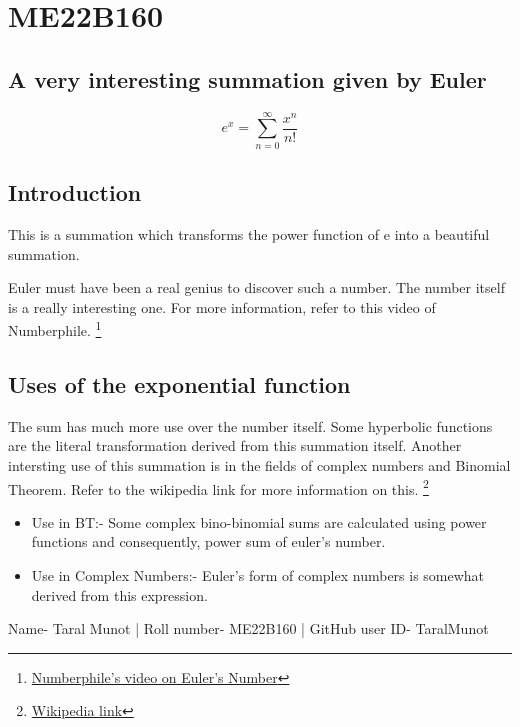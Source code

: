 \section{ME22B160}
\subsection{A very interesting summation given by Euler}
\begin{equation}
    e^x = \sum_{n=0}^{\infty} \frac{x^n}{n!}
\end{equation}
\subsection{Introduction}
This is a summation which transforms the power function of e into a beautiful summation.

Euler must have been a real genius to discover such a number. The number itself is a really interesting one. For more information, refer to this video of Numberphile. \footnote{\href{https://www.youtube.com/watch?v=AuA2EAgAegE}{Numberphile's video on Euler's Number}}
\subsection{Uses of the exponential function}
The sum has much more use over the number itself. Some hyperbolic functions are the literal transformation derived from this summation itself. Another intersting use of this summation is in the fields of complex numbers and Binomial Theorem. Refer to the wikipedia link for more information on this. \footnote{\href{https://en.wikipedia.org/wiki/Exponential_function}{Wikipedia link}}
\begin{itemize}
    \item Use in BT:- Some complex bino-binomial sums are calculated using power functions and consequently, power sum of euler's number.
    \item Use in Complex Numbers:- Euler's form of complex numbers is somewhat derived from this expression.
\end{itemize}

Name- Taral Munot | Roll number- ME22B160 | GitHub user ID- TaralMunot